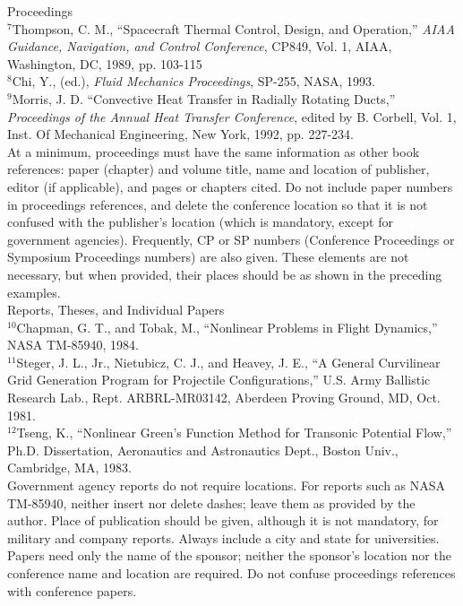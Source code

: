 Proceedings \\ $^7$Thompson, C. M., “Spacecraft Thermal Control, Design, and Operation,” \textit{AIAA Guidance, Navigation, and Control Conference}, CP849, Vol. 1, AIAA, Washington, DC, 1989, pp. 103-115 \\ $^8$Chi, Y., (ed.), \textit{Fluid Mechanics Proceedings}, SP-255, NASA, 1993. \\ $^9$Morris, J. D. “Convective Heat Transfer in Radially Rotating Ducts,” \textit{Proceedings of the Annual Heat Transfer Conference}, edited by B. Corbell, Vol. 1, Inst. Of Mechanical Engineering, New York, 1992, pp. 227-234. \\

At a minimum, proceedings must have the same information as other book references: paper (chapter) and volume title, name and location of publisher, editor (if applicable), and pages or chapters cited. Do not include paper numbers in proceedings references, and delete the conference location so that it is not confused with the publisher’s location (which is mandatory, except for government agencies). Frequently, CP or SP numbers (Conference Proceedings or Symposium Proceedings numbers) are also given. These elements are not necessary, but when provided, their places should be as shown in the preceding examples. \\

Reports, Theses, and Individual Papers \\ $^{10}$Chapman, G. T., and Tobak, M., “Nonlinear Problems in Flight Dynamics,” NASA TM-85940, 1984. \\ $^{11}$Steger, J. L., Jr., Nietubicz, C. J., and Heavey, J. E., “A General Curvilinear Grid Generation Program for Projectile Configurations,” U.S. Army Ballistic Research Lab., Rept. ARBRL-MR03142, Aberdeen Proving Ground, MD, Oct. 1981. \\ $^{12}$Tseng, K., “Nonlinear Green’s Function Method for Transonic Potential Flow,” Ph.D. Dissertation, Aeronautics and Astronautics Dept., Boston Univ., Cambridge, MA, 1983. \\

Government agency reports do not require locations. For reports such as NASA TM-85940, neither insert nor delete dashes; leave them as provided by the author. Place of publication should be given, although it is not mandatory, for military and company reports. Always include a city and state for universities. Papers need only the name of the sponsor; neither the sponsor’s location nor the conference name and location are required. Do not confuse proceedings references with conference papers. \\

